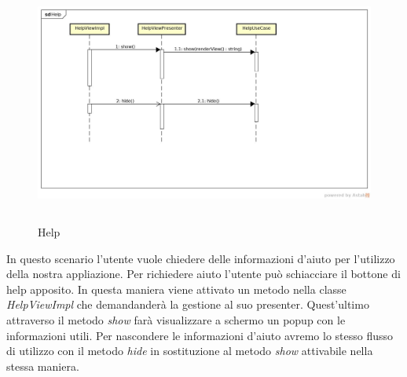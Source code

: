 \label{Help}
\begin{figure}[H]
	\centering
	\includegraphics[width=12cm, height=8cm]{Sezioni/Diagrammi/img_app/Help.jpg}
	\caption{Help}
	
\end{figure}

In questo scenario l'utente vuole chiedere delle informazioni d'aiuto per l'utilizzo della nostra appliazione. Per richiedere aiuto l'utente può schiacciare il bottone di help apposito. In questa maniera viene attivato un metodo nella classe \textit{HelpViewImpl} che demandanderà la gestione al suo presenter. Quest'ultimo attraverso il metodo \textit{show} farà visualizzare a schermo un popup con le informazioni utili. Per nascondere le informazioni d'aiuto avremo lo stesso flusso di utilizzo con il metodo \textit{hide} in sostituzione al metodo \textit{show} attivabile nella stessa maniera.
